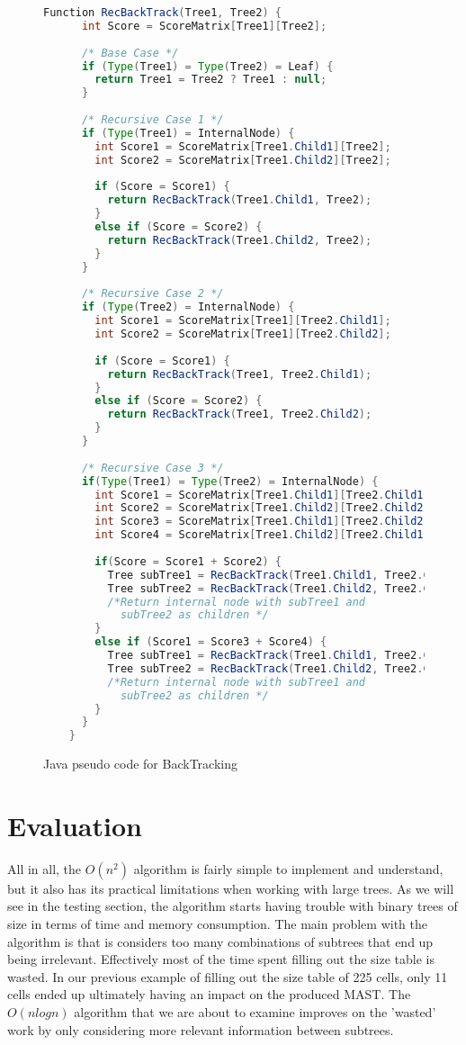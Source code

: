 \begin{figure}
	\begin{lstlisting}[language=Java]
	Function RecBackTrack(Tree1, Tree2)	{
	  int Score = ScoreMatrix[Tree1][Tree2];
	  
	  /* Base Case */
	  if (Type(Tree1) = Type(Tree2) = Leaf) {
	    return Tree1 = Tree2 ? Tree1 : null; 
	  }
	  
	  /* Recursive Case 1 */
	  if (Type(Tree1) = InternalNode) {
	    int Score1 = ScoreMatrix[Tree1.Child1][Tree2]; 
	    int Score2 = ScoreMatrix[Tree1.Child2][Tree2];
	  
	    if (Score = Score1) {
	      return RecBackTrack(Tree1.Child1, Tree2);
	    }
	    else if (Score = Score2) {
	      return RecBackTrack(Tree1.Child2, Tree2);
	    }
	  }
	  
	  /* Recursive Case 2 */
	  if (Type(Tree2) = InternalNode) {
	    int Score1 = ScoreMatrix[Tree1][Tree2.Child1]; 
	    int Score2 = ScoreMatrix[Tree1][Tree2.Child2];
	  
	    if (Score = Score1) {
	      return RecBackTrack(Tree1, Tree2.Child1);
	    }
	    else if (Score = Score2) {
	      return RecBackTrack(Tree1, Tree2.Child2);
	    }
	  }	
	  
	  /* Recursive Case 3 */
	  if(Type(Tree1) = Type(Tree2) = InternalNode) {
	    int Score1 = ScoreMatrix[Tree1.Child1][Tree2.Child1];
	    int Score2 = ScoreMatrix[Tree1.Child2][Tree2.Child2];
	    int Score3 = ScoreMatrix[Tree1.Child1][Tree2.Child2];
	    int Score4 = ScoreMatrix[Tree1.Child2][Tree2.Child1];
	
	    if(Score = Score1 + Score2) {
	      Tree subTree1 = RecBackTrack(Tree1.Child1, Tree2.Child1);
	      Tree subTree2 = RecBackTrack(Tree1.Child2, Tree2.Child2);
	      /*Return internal node with subTree1 and 
	        subTree2 as children */
	    }
	    else if (Score1 = Score3 + Score4) {
	      Tree subTree1 = RecBackTrack(Tree1.Child1, Tree2.Child2);
          Tree subTree2 = RecBackTrack(Tree1.Child2, Tree2.Child1);
	      /*Return internal node with subTree1 and 
	        subTree2 as children */
	    }
	  }
	}
	\end{lstlisting}
	\caption{Java pseudo code for BackTracking}
	\label{Code:Backtracking1}
\end{figure}	

\section{Evaluation}
All in all, the $O(n^2)$ algorithm is fairly simple to implement and understand, but it also has its practical limitations when working with large trees. As we will see in the testing section, the algorithm starts having trouble with binary trees of size  in terms of time and memory consumption. The main problem with the algorithm is that is considers too many combinations of subtrees that end up being irrelevant. Effectively most of the time spent filling out the size table is wasted. In our previous example of filling out the size table of 225 cells, only 11 cells ended up ultimately having an impact on the produced MAST. The $O(nlogn)$ algorithm that we are about to examine improves on the 'wasted' work by only considering more relevant information between subtrees.
  

